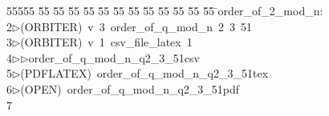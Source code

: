 %
%
\begin{tabbing}
55555 \= 55 \= 55 \= 55 \= 55 \= 55 \= 55 \= 55 \= 55 \= 55 \= 55 \= 55 \= 55 \= \>order\_of\_2\_mod\_n:\\[0pt]
2\>$\triangleright$\>(ORBITER)\ v\ 3\ order\_of\_q\_mod\_n\ 2\ 3\ 51\\[0pt]
3\>$\triangleright$\>(ORBITER)\ v\ 1\ csv\_file\_latex\ 1\ \\[0pt]
4\>$\triangleright$\>$\triangleright$\>order\_of\_q\_mod\_n\_q2\_3\_51csv\\[0pt]
5\>$\triangleright$\>(PDFLATEX)\ order\_of\_q\_mod\_n\_q2\_3\_51tex\\[0pt]
6\>$\triangleright$\>(OPEN)\ order\_of\_q\_mod\_n\_q2\_3\_51pdf\\[0pt]
7\>\end{tabbing}
